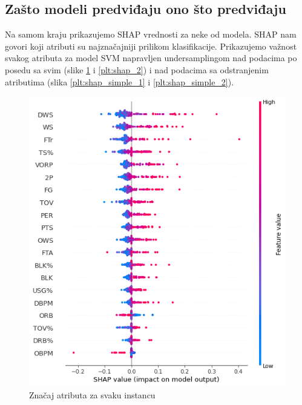 \documentclass[a4paper]{article}
\begin{document}
\subsection{Zašto modeli predviđaju ono što predviđaju}
\label{subsec:modeli_pred}

Na samom kraju prikazujemo SHAP vrednosti za neke od modela. SHAP nam govori koji atributi su najznačajniji prilikom klasifikacije. Prikazujemo važnost svakog atributa za model SVM napravljen undersamplingom nad podacima po posedu sa svim (slike \ref{plt:shap_1} i \ref{plt:shap_2}) i nad podacima sa odstranjenim atributima (slika \ref{plt:shap_simple_1} i \ref{plt:shap_simple_2}).

\begin{figure}[h!]
\begin{center}
\includegraphics[scale=0.4]{shap_1.png}
\end{center}
\caption{Značaj atributa za svaku instancu}
\label{plt:shap_1}
\end{figure}
\end{document}
